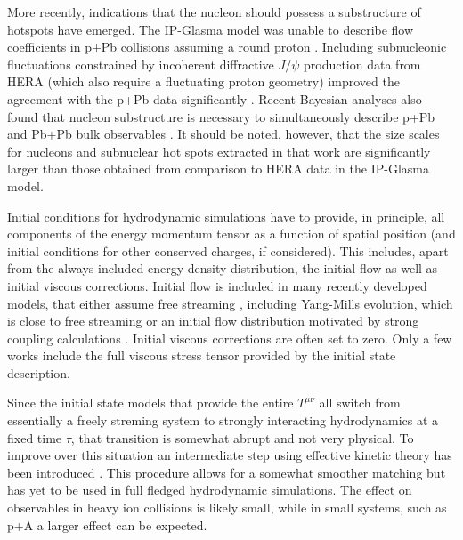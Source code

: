More recently, indications that the nucleon should possess a substructure of hotspots have emerged. The IP-Glasma model was unable to describe flow coefficients in p+Pb collisions assuming a round proton \cite{Schenke:2014zha}. Including subnucleonic fluctuations constrained by incoherent diffractive $J/\psi$ production data from HERA \cite{Mantysaari:2016ykx} (which also require a fluctuating proton geometry) improved the agreement with the p+Pb data significantly \cite{Mantysaari:2017cni}. Recent Bayesian analyses also found that nucleon substructure is necessary to simultaneously describe p+Pb and Pb+Pb bulk observables \cite{Moreland:2018gsh}.
It should be noted, however, that the size scales for nucleons and subnuclear hot spots extracted in that work are significantly larger than those obtained from comparison to HERA data in the IP-Glasma model.

Initial conditions for hydrodynamic simulations have to provide, in principle, all components of the energy momentum tensor as a function of spatial position (and initial conditions for other conserved charges, if considered). This includes, apart from the always included energy density distribution, the initial flow as well as initial viscous corrections. Initial flow is included in many recently developed models, that either assume free streaming \cite{Moreland:2018gsh}, including Yang-Mills evolution, which is close to free streaming \cite{Gale:2012rq} or an initial flow distribution motivated by strong coupling calculations \cite{Weller:2017tsr}. Initial viscous corrections are often set to zero. Only a few works \cite{Mantysaari:2017cni,Schenke:2018fci,Moreland:2018gsh} include the full viscous stress tensor provided by the initial state description.

Since the initial state models that provide the entire $T^{\mu\nu}$ all switch from essentially a freely streming system to strongly interacting hydrodynamics at a fixed time $\tau$, that transition is somewhat abrupt and not very physical. To improve over this situation an intermediate step using effective kinetic theory has been introduced \cite{Kurkela:2018wud,Kurkela:2018vqr}. This procedure allows for a somewhat smoother matching but has yet to be used in full fledged hydrodynamic simulations. The effect on observables in heavy ion collisions is likely small, while in small systems, such as p+A a larger effect can be expected.

